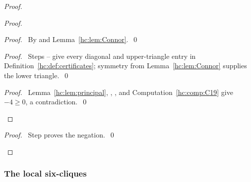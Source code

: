\begin{mergedproofsection}
\begin{proof}
\begin{proof}
  \begin{proof}\pf\ By  and Lemma~\ref{hc:lem:Connor}.~\qed\end{proof}
  \begin{proof}\pf\ Steps --
   give every diagonal and upper-triangle entry in
   Definition~\ref{hc:def:certificates}; symmetry from
   Lemma~\ref{hc:lem:Connor} supplies the lower triangle.~\qed\end{proof}
  \qedstep
  \begin{proof}\pf\ Lemma~\ref{hc:lem:principal},
   , , and
   Computation~\ref{hc:comp:C19} give $-4\ge0$, a contradiction.~\qed\end{proof}
 \end{proof}
 \qedstep
 \begin{proof}\pf\ Step  proves the negation.~\qed\end{proof}
\end{proof}

\subsubsection{The local six-cliques}


\end{mergedproofsection}
